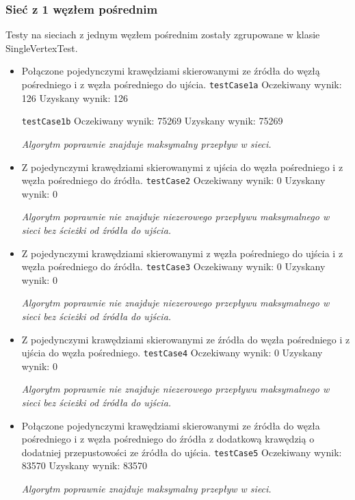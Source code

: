\subsubsection{Sieć z 1 węzłem pośrednim}
Testy na sieciach z jednym węzłem pośrednim zostały zgrupowane
w klasie SingleVertexTest.
\begin{itemize}[nosep]
    \item Połączone pojedynczymi krawędziami skierowanymi ze źródła do węzłą
    pośredniego i z węzła pośredniego do ujścia.
    \texttt{testCase1a}
    Oczekiwany wynik: 126
    Uzyskany wynik: 126

    \texttt{testCase1b}
    Oczekiwany wynik: 75269
    Uzyskany wynik: 75269

    \emph{Algorytm poprawnie znajduje maksymalny przepływ w sieci.}

    \item Z pojedynczymi krawędziami skierowanymi z ujścia do węzła pośredniego
    i z węzła pośredniego do źródła.
    \texttt{testCase2}
    Oczekiwany wynik: 0
    Uzyskany wynik: 0

    \emph{Algorytm poprawnie nie znajduje niezerowego przepływu maksymalnego
    w sieci bez ścieżki od źródła do ujścia.}

    \item Z pojedynczymi krawędziami skierowanymi z węzła pośredniego do ujścia
    i z węzła pośredniego do źródła.
    \texttt{testCase3}
    Oczekiwany wynik: 0
    Uzyskany wynik: 0

    \emph{Algorytm poprawnie nie znajduje niezerowego przepływu maksymalnego
    w sieci bez ścieżki od źródła do ujścia.}

    \item Z pojedynczymi krawędziami skierowanymi ze źródła do węzła pośredniego
    i z ujścia do węzła pośredniego.
    \texttt{testCase4}
    Oczekiwany wynik: 0
    Uzyskany wynik: 0

    \emph{Algorytm poprawnie nie znajduje niezerowego przepływu maksymalnego
    w sieci bez ścieżki od źródła do ujścia.}

    \item Połączone pojedynczymi krawędziami skierowanymi ze źródła do węzła
    pośredniego i z węzła pośredniego do źródła z dodatkową krawędzią o
    dodatniej przepustowości ze źródła do ujścia.
    \texttt{testCase5}
    Oczekiwany wynik: 83570
    Uzyskany wynik: 83570

    \emph{Algorytm poprawnie znajduje maksymalny przepływ w sieci.}


\end{itemize}
